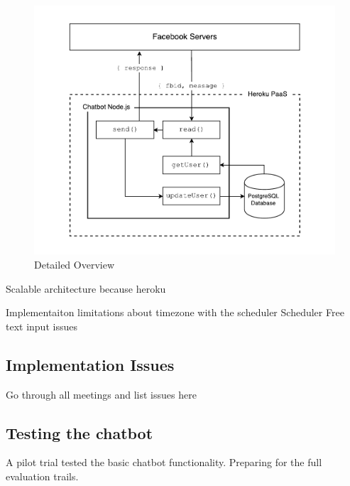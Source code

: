 \begin{figure}[H]
    \centering
    \includegraphics[width=6in]{../resources/diagrams/chatbot-detailed-overview.pdf}
    \caption{Detailed Overview}
    \label{fig:prototype_detailed_overview}
\end{figure}

Scalable architecture because heroku\newline

Implementaiton limitations about timezone with the scheduler\newline
Scheduler\newline
Free text input issues\newline

\subsection{Implementation Issues}

Go through all meetings and list issues here

\subsection{Testing the chatbot}

A pilot trial tested the basic chatbot functionality. Preparing for the full evaluation trails.

\newpage